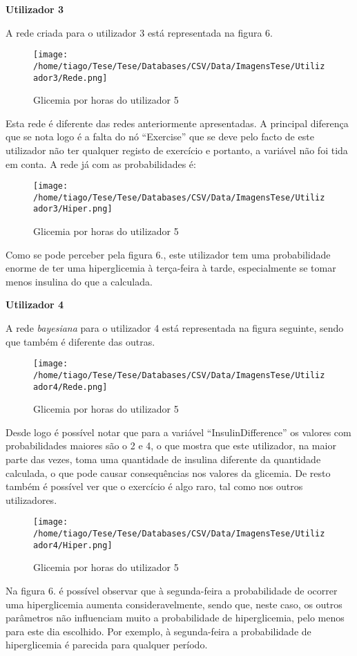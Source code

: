 \textbf{Utilizador 3}

A rede criada para o utilizador 3 está representada na figura 6.

\begin{figure}[H]
\centering
\texttt{[image: /home/tiago/Tese/Tese/Databases/CSV/Data/ImagensTese/Utilizador3/Rede.png]}
\caption{Glicemia por horas do utilizador 5}
\end{figure}
Esta rede é diferente das redes anteriormente apresentadas. A principal diferença que se nota logo é a falta do nó ``Exercise'' que se deve pelo facto de este utilizador não ter qualquer registo de exercício e portanto, a variável não foi tida em conta. A rede já com as probabilidades é:

\begin{figure}[H]
\centering
\texttt{[image: /home/tiago/Tese/Tese/Databases/CSV/Data/ImagensTese/Utilizador3/Hiper.png]}
\caption{Glicemia por horas do utilizador 5}
\end{figure}
Como se pode perceber pela figura 6., este utilizador tem uma probabilidade enorme de ter uma hiperglicemia à terça-feira à tarde, especialmente se tomar menos insulina do que a calculada. 

\textbf{Utilizador 4}

A rede \textit{bayesiana} para o utilizador 4 está representada na figura seguinte, sendo que também é diferente das outras. 

\begin{figure}[H]
\centering
\texttt{[image: /home/tiago/Tese/Tese/Databases/CSV/Data/ImagensTese/Utilizador4/Rede.png]}
\caption{Glicemia por horas do utilizador 5}
\end{figure}
Desde logo é possível notar que para a variável ``Insulin\textunderscore Difference'' os valores com probabilidades maiores são o 2 e 4, o que mostra que este utilizador, na maior parte das vezes, toma uma quantidade de insulina diferente da quantidade calculada, o que pode causar consequências nos valores da glicemia. De resto também é possível ver que o exercício é algo raro, tal como nos outros utilizadores. 


\begin{figure}[H]
\centering
\texttt{[image: /home/tiago/Tese/Tese/Databases/CSV/Data/ImagensTese/Utilizador4/Hiper.png]}
\caption{Glicemia por horas do utilizador 5}
\end{figure}
Na figura 6. é possível observar que à segunda-feira a probabilidade de ocorrer uma hiperglicemia aumenta consideravelmente, sendo que, neste caso, os outros parâmetros não influenciam muito a probabilidade de hiperglicemia, pelo menos para este dia escolhido. Por exemplo, à segunda-feira a probabilidade de hiperglicemia é parecida para qualquer período.

